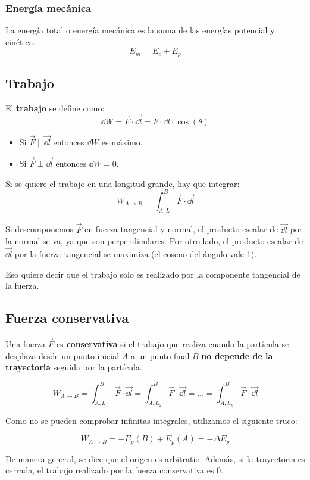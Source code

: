 \documentclass[a4paper]{book}
\begin{document}
\subsubsection{Energía mecánica}
La energía total o energía mecánica es la suma de las energías potencial y cinética.
\[\boxed{E_m = E_c + E_p}\]

\subsection{Trabajo}
\label{subsec:trabajo}
El \textbf{trabajo} se define como: \[\boxed{\dd{W} = \vec{F}\cdot \vec{\dd{l}}} = F\cdot \dd{l}\cdot \cos{\left( \theta \right)}\]

\begin{itemize}
	\item Si $\vec{F}\parallel \vec{\dd l}$ entonces $\dd W$ es máximo.
	\item Si $\vec{F}\perp \vec{\dd l}$ entonces $\dd W = 0$.
\end{itemize}

Si se quiere el trabajo en una longitud grande, hay que integrar: \[W_{A\to B} = \int_{A,L}^B{\vec{F}\cdot \vec{\dd l}}\]

Si descomponemos  $\vec{F}$ en fuerza tangencial y normal, el producto escalar de $\vec{\dd l}$ por la normal se va, ya que son perpendiculares. Por otro lado, el producto escalar de $\vec{\dd l}$ por la fuerza tangencial se maximiza (el coseno  del ángulo vale 1).

Eso quiere decir que el trabajo solo es realizado por la componente tangencial de la fuerza.

\subsection{Fuerza conservativa}
\label{subsec:fuerza_conservativa}
Una fuerza $\vec{F}$ es \textbf{conservativa} si el trabajo que realiza cuando la partícula se desplaza desde un punto inicial $A$ a un punto final $B$ \textbf{no depende de la trayectoria} seguida por la partícula.

\[W_{A\to B} = \int_{A,L_1}^{B}{\vec{F}\cdot \vec{\dd l}}= \int_{A,L_2}^{B}{\vec{F}\cdot \vec{\dd l}} = \dots = \int_{A,L_n}^{B}{\vec{F}\cdot \vec{\dd l}}\]

Como no se pueden comprobar infinitas integrales, utilizamos el siguiente truco:

\[W_{A\to B} = - E_p(B) + E_p(A) = -\Delta E_p\]

De manera general, se dice que el origen es arbitratio. Además, si la trayectoria es cerrada, el trabajo realizado por la fuerza conservativa es 0.
\end{document}
